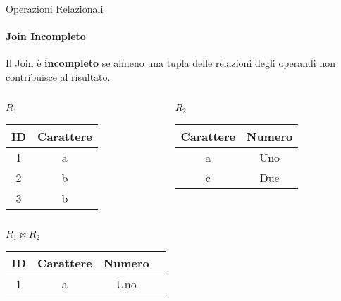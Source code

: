     \begin{frame}{Operazioni Relazionali}
        \framesubtitle{Join Incompleto}
        Il Join \`e \textbf{incompleto} se almeno una tupla delle relazioni degli operandi non contribuisce al risultato.
        \begin{columns}
            \begin{column}{0.48\textwidth}
                \centering
                {\small $R_1$}
                \newline
        \begin{tabular}{|c|c|}
            \hline
            \rowcolor{cyan!30}ID & Carattere \\
            \hline
            1 & \cellcolor{green!30}a \\ \hline
            2 & b \\ \hline
            3 & b \\ \hline
            \end{tabular}
            \end{column}
            \begin{column}{0.48\textwidth}
                \centering
                {\small $R_2$}
                \newline
                \begin{tabular}{|c|c|}
                    \hline
                    \rowcolor{cyan!30} Carattere & Numero \\ \hline
                    \cellcolor{green!30}a & Uno \\ \hline
                    \cellcolor{red}c & Due \\ \hline
                    \end{tabular}
            \end{column}
        \end{columns}
        \vspace{.5cm}
        \centering
        $R_1 \bowtie R_2$
        \begin{tabular}{|c|c|c|c|}
            \hline
            \rowcolor{cyan!30} ID & Carattere & Numero \\ \hline
            1 & a & Uno \\ \hline
            \end{tabular}
    \end{frame}
